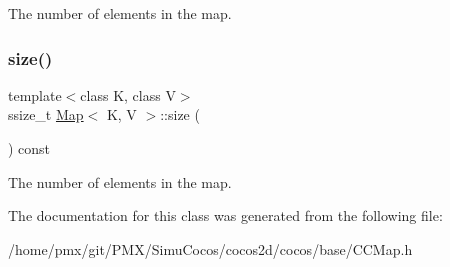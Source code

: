The number of elements in the map. \mbox{\label{classMap_a69c355a6d393f859d830ddb3e476c8ec}} 
\subsubsection{\texorpdfstring{size()}{size()}\hspace{0.1cm}{\footnotesize\ttfamily [2/2]}}
{\footnotesize\ttfamily template$<$class K, class V$>$ \\
ssize\+\_\+t \hyperlink{classMap}{Map}$<$ K, V $>$\+::size (\begin{DoxyParamCaption}{ }\end{DoxyParamCaption}) const\hspace{0.3cm}{\ttfamily [inline]}}

The number of elements in the map. 

The documentation for this class was generated from the following file\+:\begin{DoxyCompactItemize}
\item 
/home/pmx/git/\+P\+M\+X/\+Simu\+Cocos/cocos2d/cocos/base/C\+C\+Map.\+h\end{DoxyCompactItemize}
